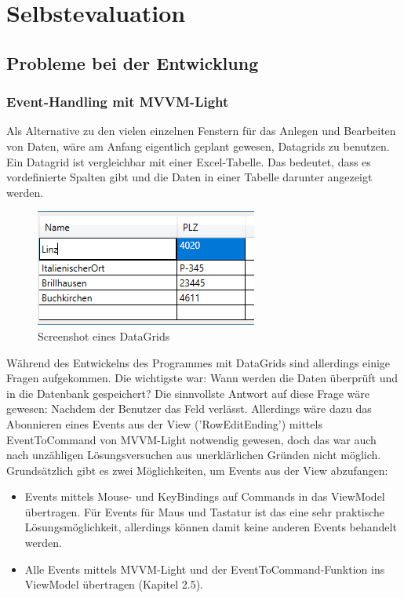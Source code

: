 \chapter{Selbstevaluation}\label{cha:theoretical-background}
\section{Probleme bei der Entwicklung}
\subsection{Event-Handling mit MVVM-Light}
Als Alternative zu den vielen einzelnen Fenstern für das Anlegen und Bearbeiten von Daten, wäre am Anfang eigentlich geplant gewesen, Datagrids zu benutzen. Ein Datagrid ist vergleichbar mit einer Excel-Tabelle. Das bedeutet, dass es vordefinierte Spalten gibt und die Daten in einer Tabelle darunter angezeigt werden. 
\begin{figure}[H]
\begin{center}
	\includegraphics[scale=.75]{images/datagrid.png}
\end{center}
	\caption{Screenshot eines DataGrids}
	\label{fig:sample}
\end{figure}
\noindent Während des Entwickelns des Programmes mit DataGrids sind allerdings einige Fragen aufgekommen. Die wichtigste war: Wann werden die Daten überprüft und in die Datenbank gespeichert? Die sinnvollste Antwort auf diese Frage wäre gewesen: Nachdem der Benutzer das Feld verlässt. Allerdings wäre dazu das Abonnieren eines Events aus der View ('RowEditEnding') mittels EventToCommand von MVVM-Light notwendig gewesen, doch das war auch nach unzähligen Lösungsversuchen aus unerklärlichen Gründen nicht möglich. Grundsätzlich gibt es zwei Möglichkeiten, um Events aus der View abzufangen:
\begin{itemize}
\item Events mittels Mouse- und KeyBindings auf Commands in das ViewModel übertragen. Für Events für Maus und Tastatur ist das eine sehr praktische Lösungsmöglichkeit, allerdings können damit keine anderen Events behandelt werden.
\item Alle Events mittels MVVM-Light und der EventToCommand-Funktion ins ViewModel übertragen (Kapitel 2.5).
\end{itemize}

